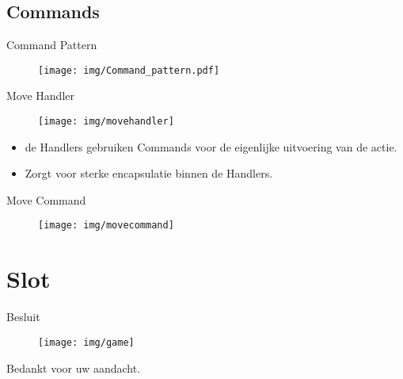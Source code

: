 \documentclass[t]{beamer}
\begin{document}
\subsection{Commands}
\begin{frame}{Command Pattern}
\begin{figure}
	\center
	\texttt{[image: img/Command\_pattern.pdf]}
\end{figure}	
\end{frame}


\begin{frame}{Move Handler}
\begin{multicols}{2}
\begin{minipage}{\columnwidth}
\begin{figure}
	\center
	\texttt{[image: img/movehandler]}
\end{figure}
\end{minipage}
\begin{minipage}{\columnwidth}
\begin{itemize}
	\item de Handlers gebruiken Commands voor de eigenlijke uitvoering van de actie.
	\item Zorgt voor sterke encapsulatie binnen de Handlers.
\end{itemize}
\end{minipage}
\end{multicols}
\end{frame}

\begin{frame}{Move Command}
\begin{figure}
	\center
	\texttt{[image: img/movecommand]}
\end{figure}
\end{frame}


\section{Slot}
\begin{frame}{Besluit}

\begin{center}
\begin{figure}
\texttt{[image: img/game]}
\end{figure}
\vspace{0.1in}
Bedankt voor uw aandacht.
\end{center}
\end{frame}
\end{document}
